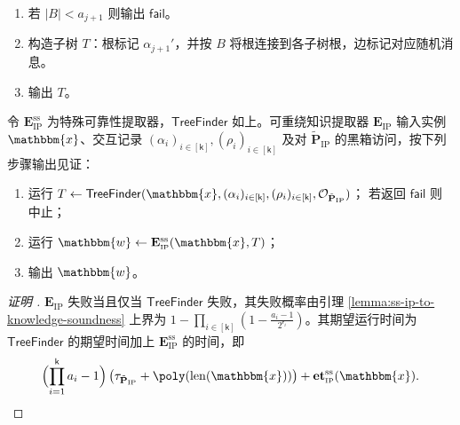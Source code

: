 \documentclass[american,singlepageview]{snargs-book-zh}
\newcommand{\Malicious}[1]{\tilde{#1}}
\newcommand{\concat}{\|}
\newcommand{\BlackBox}[1]{\mathcal{O}_{#1}}
\newcommand{\BitSize}[1]{\mathrm{len}(#1)}
\newcommand{\Instance}{\mathbbm{x}}
\newcommand{\Witness}{\mathbbm{w}}
\newcommand{\ProtoProver}{P}
\newcommand{\ProtoExtractor}{E}
\newcommand{\ProtoKnowledgeTime}{\mathbf{et}}
\newcommand{\ProtoRoundComplexity}{\mathsf{k}}
\newcommand{\ProtoRandomnessComplexity}{\mathsf{r}}
\newcommand{\RoundIndex}{i}
\newcommand{\IPSubscript}{\scriptscriptstyle\mathrm{IP}}
\newcommand{\IPFormat}[1]{\mathbf{#1}}
\newcommand{\IPExtractor}{\IPFormat{\ProtoExtractor}_{\IPSubscript}}
\newcommand{\IPMaliciousProver}{\Malicious{\IPFormat{\ProtoProver}}_{\IPSubscript}}
\newcommand{\IPRoundComplexity}{\ProtoRoundComplexity}
\newcommand{\IPRandomnessCardinality}[1]{2^{\ProtoRandomnessComplexity_{#1}}}
\newcommand{\IPProverMessage}{\alpha}
\newcommand{\IPVerifierRandomMessage}{\rho}
\newcommand{\IPTuple}[1]{(#1_{\RoundIndex})_{\RoundIndex \in [\IPRoundComplexity]}}
\newcommand{\ProverRunningTime}[1]{\tau_{#1}}
\newcommand{\SSSuperscript}{\mathrm{ss}}
\newcommand{\SSArity}{a}
\newcommand{\SSTree}{T}
\newcommand{\IPSSExtractor}{\IPExtractor^{\SSSuperscript}}
\newcommand{\IPSSKnowledgeTime}{\ProtoKnowledgeTime_{\IPSubscript}^{\SSSuperscript}}
\newcommand{\SSTreeFinder}{\mathsf{TreeFinder}}
\newcommand{\SSRemainingRandomness}{S}
\newcommand{\SSBranches}{B}
\newcommand{\SSFail}{\mathsf{fail}}
\newcommand{\SSPartialProverMessages}{(\IPProverMessage_{\RoundIndex}')_{\RoundIndex=1}^{j}}
\newcommand{\SSPartialVerifierMessages}{(\IPVerifierRandomMessage_{\RoundIndex}')_{\RoundIndex=1}^{j}}
\newcommand{\IPKowledgeErrorMainFromSS}{\prod_{\RoundIndex \in [\IPRoundComplexity]} \left( 1 - \frac{\SSArity_{\RoundIndex}-1}{\IPRandomnessCardinality{\RoundIndex}} \right)}
\newcommand{\IPKowledgeErrorFromSS}{1-\IPKowledgeErrorMainFromSS}
\begin{document}
\begin{construction}
\begin{enumerate}[nolistsep]
\begin{enumerate}[nolistsep]
      \item 随机取并移除 $\IPVerifierRandomMessage_{j+1}'\in\SSRemainingRandomness$；
      \item 递归调用
        \[
          \SSTree_{\IPVerifierRandomMessage_{j+1}'}
          \gets
          \SSTreeFinder_{j+1}\bigl(0,\Instance,
          \SSPartialProverMessages\concat\IPProverMessage_{j+1}',\,
          \SSPartialVerifierMessages\concat\IPVerifierRandomMessage_{j+1}',\,
          \IPTuple{\IPProverMessage},\IPTuple{\IPVerifierRandomMessage},\BlackBox{\IPMaliciousProver}\bigr);
        \]
      \item 若不为 $\SSFail$ 则加入 $\SSBranches$。
    \end{enumerate}
  \item 若 $|\SSBranches|<\SSArity_{j+1}$ 则输出 $\SSFail$。
  \item 构造子树 $\SSTree$：根标记 $\IPProverMessage_{j+1}'$，并按 $\SSBranches$ 将根连接到各子树根，边标记对应随机消息。
  \item 输出 $\SSTree$。
\end{enumerate}
\end{construction}

\begin{construction}
\label{construction:ss-extractor-for-ip}
令 $\IPSSExtractor$ 为特殊可靠性提取器，$\SSTreeFinder$ 如上。可重绕知识提取器 $\IPExtractor$ 输入实例 $\Instance$、交互记录 $\IPTuple{\IPProverMessage},\IPTuple{\IPVerifierRandomMessage}$ 及对 $\IPMaliciousProver$ 的黑箱访问，按下列步骤输出见证：
\begin{enumerate}[nolistsep]
  \item 运行
    $\SSTree\gets\SSTreeFinder(\Instance,\IPTuple{\IPProverMessage},\IPTuple{\IPVerifierRandomMessage},\BlackBox{\IPMaliciousProver})$；
    若返回 $\SSFail$ 则中止；
  \item 运行
    $\Witness\gets\IPSSExtractor(\Instance,\SSTree)$；
  \item 输出 $\Witness$。
\end{enumerate}
\end{construction}

\begin{proof}[证明 ]
$\IPExtractor$ 失败当且仅当 $\SSTreeFinder$ 失败，其失败概率由引理 \ref{lemma:ss-ip-to-knowledge-soundness} 上界为 $\IPKowledgeErrorFromSS$。其期望运行时间为 $\SSTreeFinder$ 的期望时间加上 $\IPSSExtractor$ 的时间，即
\[
  \Bigl(\prod_{\RoundIndex=1}^{\IPRoundComplexity}\SSArity_{\RoundIndex}-1\Bigr)\,
  \bigl(\ProverRunningTime{\IPMaliciousProver}+\poly(\BitSize{\Instance})\bigr)
  +\IPSSKnowledgeTime(\Instance).
\]
\end{proof}
\end{document}
